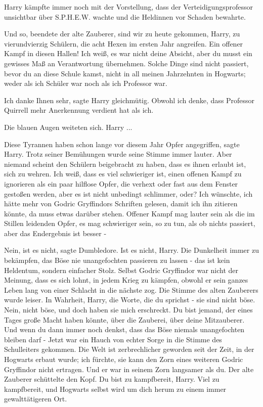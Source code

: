 Harry kämpfte immer noch mit der Vorstellung, dass der Verteidigungsprofessor
unsichtbar über S.P.H.E.W. wachte und die Heldinnen vor Schaden bewahrte.

\glqq{}Und so\grqq{}, beendete der alte Zauberer, \glqq{}sind wir zu heute
gekommen, Harry, zu vierundvierzig Schülern, die acht Hexen im ersten Jahr
angreifen. Ein offener Kampf in diesen Hallen! Ich weiß, es war nicht deine
Absicht, aber du musst ein gewisses Maß an Verantwortung übernehmen. Solche
Dinge sind nicht passiert, bevor du an diese Schule kamst, nicht in all meinen
Jahrzehnten in Hogwarts; weder als ich Schüler war noch als ich Professor
war.\grqq{}

\glqq{}Ich danke Ihnen sehr\grqq{}, sagte Harry gleichmütig. \glqq{}Obwohl ich
denke, dass Professor Quirrell mehr Anerkennung verdient hat als ich.\grqq{}

Die blauen Augen weiteten sich. \glqq{}Harry ...\grqq{}

\glqq{}Diese Tyrannen haben schon lange vor diesem Jahr Opfer angegriffen\grqq{},
sagte Harry. Trotz seiner Bemühungen wurde seine Stimme immer lauter. \glqq{}Aber
niemand scheint den Schülern beigebracht zu haben, dass es ihnen erlaubt ist,
sich zu wehren. Ich weiß, dass es viel schwieriger ist, einen offenen Kampf zu
ignorieren als ein paar hilflose Opfer, die verhext oder fast aus dem Fenster
gestoßen werden, aber es ist nicht unbedingt schlimmer, oder? Ich wünschte, ich
hätte mehr von Godric Gryffindors Schriften gelesen, damit ich ihn zitieren
könnte, da muss etwas darüber stehen. Offener Kampf mag lauter sein als die im
Stillen leidenden Opfer, es mag schwieriger sein, so zu tun, als ob nichts
passiert, aber das Endergebnis ist besser -\grqq{}

\glqq{}Nein, ist es nicht\grqq{}, sagte Dumbledore. \glqq{}Ist es nicht, Harry.
Die Dunkelheit immer zu bekämpfen, das Böse nie unangefochten passieren zu
lassen - das ist kein Heldentum, sondern einfacher Stolz. Selbst Godric
Gryffindor war nicht der Meinung, dass es sich lohnt, in jedem Krieg zu kämpfen,
obwohl er sein ganzes Leben lang von einer Schlacht in die nächste zog.\grqq{}
Die Stimme des alten Zauberers wurde leiser. \glqq{}In Wahrheit, Harry, die
Worte, die du sprichst - sie sind nicht böse. Nein, nicht böse, und doch haben
sie mich erschreckt. Du bist jemand, der eines Tages große Macht haben könnte,
über die Zauberei, über deine Mitzauberer. Und wenn du dann immer noch denkst,
dass das Böse niemals unangefochten bleiben darf -\grqq{} Jetzt war ein Hauch
von echter Sorge in die Stimme des Schulleiters gekommen. \glqq{}Die Welt ist
zerbrechlicher geworden seit der Zeit, in der Hogwarts erbaut wurde; ich
fürchte, sie kann den Zorn eines weiteren Godric Gryffindor nicht ertragen. Und
er war in seinem Zorn langsamer als du.\grqq{} Der alte Zauberer schüttelte den
Kopf. \glqq{}Du bist zu kampfbereit, Harry. Viel zu kampfbereit, und Hogwarts
selbst wird um dich herum zu einem immer gewalttätigeren Ort.\grqq{}

